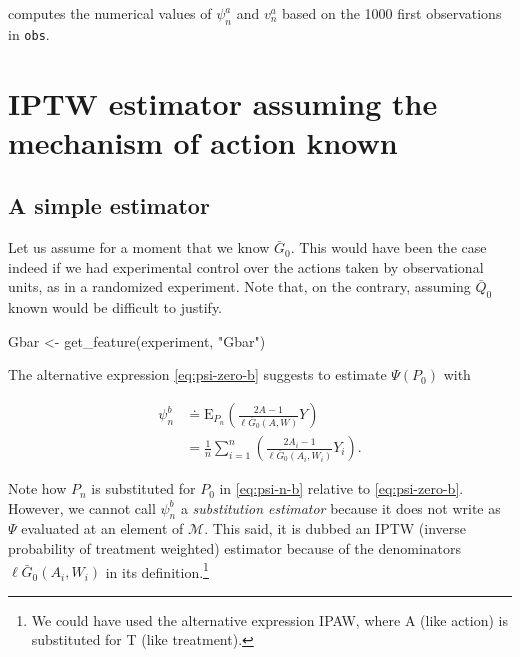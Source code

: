 \documentclass[
  11pt,
  openright,twoside]{book}
\newenvironment{Shaded}{\begin{snugshade}}{\end{snugshade}}
\newcommand{\FunctionTok}[1]{\textcolor[rgb]{0.00,0.00,0.00}{#1}}
\newcommand{\NormalTok}[1]{#1}
\newcommand{\OtherTok}[1]{\textcolor[rgb]{0.56,0.35,0.01}{#1}}
\newcommand{\StringTok}[1]{\textcolor[rgb]{0.31,0.60,0.02}{#1}}
\newcommand{\defq}{\doteq}
\newcommand{\calM}{\mathcal{M}}
\newcommand{\Exp}{\textrm{E}}
\newcommand{\Gbar}{\bar{G}}
\newcommand{\Qbar}{\bar{Q}}
\theoremstyle{definition}
\theoremstyle{definition}
\theoremstyle{definition}
\theoremstyle{definition}
\theoremstyle{remark}
\begin{document}
computes the numerical values of \(\psi_{n}^{a}\) and \(v_{n}^{a}\) based on the
1000 first observations in \texttt{obs}.

\hypertarget{known-gbar-first-pass}{%
\section{IPTW estimator assuming the mechanism of action known}\label{known-gbar-first-pass}}

\hypertarget{a-simple-estimator}{%
\subsection{A simple estimator}\label{a-simple-estimator}}

Let us assume for a moment that we know \(\Gbar_{0}\). This would have been the
case indeed if we had experimental control over the actions taken by observational units, as in a randomized experiment. Note that, on the
contrary, assuming \(\Qbar_{0}\) known would be difficult to justify.

\begin{Shaded}
\begin{Highlighting}[]
\NormalTok{Gbar }\OtherTok{\textless{}{-}} \FunctionTok{get\_feature}\NormalTok{(experiment, }\StringTok{"Gbar"}\NormalTok{)}
\end{Highlighting}
\end{Shaded}

The alternative expression \eqref{eq:psi-zero-b} suggests to estimate
\(\Psi(P_{0})\) with

\begin{align}
\psi_{n}^{b}  &\defq \Exp_{P_{n}}  \left( \frac{2A-1}{\ell  \Gbar_{0}(A,W)} Y
\right) \\ 
&       =        \frac{1}{n}       \sum_{i=1}^{n}       \left(\frac{2A_{i}-1}{
\ell\Gbar_{0}(A_{i},W_{i})}Y_{i} \right). \label{eq:psi-n-b}
\end{align}

Note how \(P_{n}\) is substituted for \(P_{0}\) in \eqref{eq:psi-n-b} relative to
\eqref{eq:psi-zero-b}. However, we cannot call \(\psi_{n}^{b}\) a \emph{substitution
estimator} because it does not write as \(\Psi\) evaluated at an element of
\(\calM\). This said, it is dubbed an IPTW (inverse probability of treatment
weighted) estimator because of the denominators \(\ell\Gbar_{0}(A_{i},W_{i})\)
in its definition.\footnote{We could have used the alternative expression IPAW, where
  A (like action) is substituted for T (like treatment).}
\end{document}
